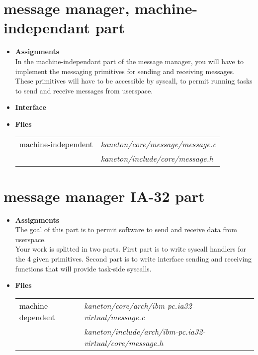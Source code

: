 \newpage

\section{message manager, \textbf{machine-independant part}}

\begin{itemize}
  \item {\bf Assignments}\\

  In the machine-independant part of the message manager, you will have to
  implement the messaging primitives for sending and receiving messages.
  These primitives will have to be accessible by syscall, to permit
  running tasks to send and receive messages from userspace.

  \item {\bf Interface}\\

	 {

	 }


  \item {\bf {Files}}\\

    \begin{tabular}{| l | l |}
      \hline
      machine-independent & {\em kaneton/core/message/message.c}\\
      &  {\em kaneton/include/core/message.h}\\\hline
    \end{tabular}
\end{itemize}

\newpage

\section{message manager \textbf{IA-32 part}}
\begin{itemize}
  \item {\bf Assignments}\\

    The goal of this part is to permit software to send and receive
    data from userspace.\\

    Your work is splitted in two parts. First part is to write syscall
    handlers for the 4 given primitives. Second part is to write interface
    sending and receiving functions that will provide task-side syscalls.

  \item {\bf {Files}}\\

    \begin{tabular}{| l | l |}
      \hline
      machine-dependent & {\em kaneton/core/arch/ibm-pc.ia32-virtual/message.c}\\
      & {\em kaneton/include/arch/ibm-pc.ia32-virtual/core/message.h}\\\hline
    \end{tabular}

\end{itemize}

